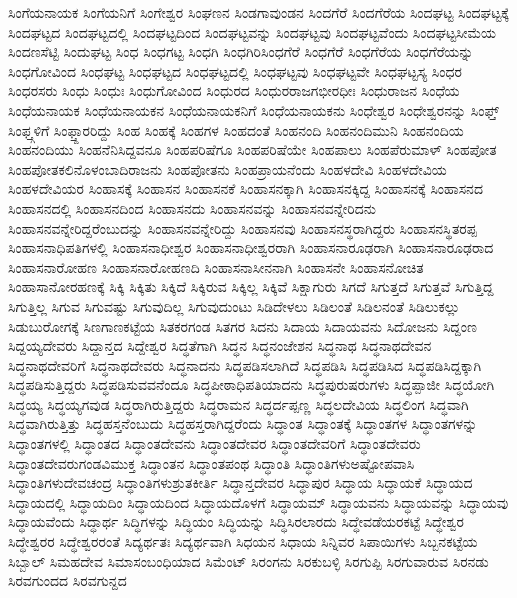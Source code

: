 {ಸಿಂಗೆಯನಾಯಕ
ಸಿಂಗೆಯನಿಗೆ
ಸಿಂಗೇಶ್ವರ
ಸಿಂಘಣನ
ಸಿಂಡಗಾವುಂಡನ
ಸಿಂದಗೆರೆ
ಸಿಂದಗೆರೆಯ
ಸಿಂದಘಟ್ಟ
ಸಿಂದಘಟ್ಟಕ್ಕೆ
ಸಿಂದಘಟ್ಟದ
ಸಿಂದಘಟ್ಟದಲ್ಲಿ
ಸಿಂದಘಟ್ಟದಿಂದ
ಸಿಂದಘಟ್ಟವನ್ನು
ಸಿಂದಘಟ್ಟವು
ಸಿಂದಘಟ್ಟವೆಂದು
ಸಿಂದಘಟ್ಟಸೀಮೆಯ
ಸಿಂದಣಸೆಟ್ಟಿ
ಸಿಂದುಘಟ್ಟ
ಸಿಂಧ
ಸಿಂಧಗಟ್ಟ
ಸಿಂಧಗಿ
ಸಿಂಧಗಿರಿಸಿಂಧಗೆರೆ
ಸಿಂಧಗೆರೆ
ಸಿಂಧಗೆರೆಯ
ಸಿಂಧಗೆರೆಯನ್ನು
ಸಿಂಧಗೋವಿಂದ
ಸಿಂಧಘಟ್ಟ
ಸಿಂಧಘಟ್ಟದ
ಸಿಂಧಘಟ್ಟದಲ್ಲಿ
ಸಿಂಧಘಟ್ಟವು
ಸಿಂಧಘಟ್ಟವೇ
ಸಿಂಧಘಟ್ಟಸ್ಯ
ಸಿಂಧರ
ಸಿಂಧರಸರು
ಸಿಂಧು
ಸಿಂಧುಃ
ಸಿಂಧುಗೋವಿಂದ
ಸಿಂಧುರದ
ಸಿಂಧುರರಾಜಗಭೀರಧೀಃ
ಸಿಂಧುರಾಜನ
ಸಿಂಧೆಯ
ಸಿಂಧೆಯನಾಯಕ
ಸಿಂಧೆಯನಾಯಕನ
ಸಿಂಧೆಯನಾಯಕನಿಗೆ
ಸಿಂಧೆಯನಾಯಕನು
ಸಿಂಧೇಶ್ವರ
ಸಿಂಧೇಶ್ವರನನ್ನು
ಸಿಂಫ್ತ್
ಸಿಂಫ್ತ್ಗಳಿಗೆ
ಸಿಂಫ್ತ್ದಾರರಿದ್ದು
ಸಿಂಹ
ಸಿಂಹಕ್ಕೆ
ಸಿಂಹಗಳ
ಸಿಂಹದಂತೆ
ಸಿಂಹನಂದಿ
ಸಿಂಹನಂದಿಮುನಿ
ಸಿಂಹನಂದಿಯ
ಸಿಂಹನಂದಿಯು
ಸಿಂಹನೆನಿಸಿದ್ದವನೂ
ಸಿಂಹಪರಿಷೆಗೂ
ಸಿಂಹಪರಿಷೆಯೇ
ಸಿಂಹಪಾಲು
ಸಿಂಹಪೆರುಮಾಳ್
ಸಿಂಹಪೋತ
ಸಿಂಹಪೋತಕಲಿನೊಳಂಬಾದಿರಾಜನು
ಸಿಂಹಪೋತನು
ಸಿಂಹಪ್ರಾಯನೆಂದು
ಸಿಂಹಳದೇವಿ
ಸಿಂಹಳದೇವಿಯ
ಸಿಂಹಳದೇವಿಯರ
ಸಿಂಹಾಸಕ್ಕೆ
ಸಿಂಹಾಸನ
ಸಿಂಹಾಸನಕೆ
ಸಿಂಹಾಸನಕ್ಕಾಗಿ
ಸಿಂಹಾಸನಕ್ಕಿದ್ದ
ಸಿಂಹಾಸನಕ್ಕೆ
ಸಿಂಹಾಸನದ
ಸಿಂಹಾಸನದಲ್ಲಿ
ಸಿಂಹಾಸನದಿಂದ
ಸಿಂಹಾಸನದು
ಸಿಂಹಾಸನವನ್ನು
ಸಿಂಹಾಸನವನ್ನೇರಿದನು
ಸಿಂಹಾಸನವನ್ನೇರಿದ್ದರೆಂಬುದನ್ನು
ಸಿಂಹಾಸನವನ್ನೇರಿದ್ದು
ಸಿಂಹಾಸನವು
ಸಿಂಹಾಸನಸ್ಥರಾಗಿದ್ದರು
ಸಿಂಹಾಸನಸ್ಥಿತರಪ್ಪ
ಸಿಂಹಾಸನಾಧಿಪತಿಗಳಲ್ಲಿ
ಸಿಂಹಾಸನಾಧೀಶ್ವರ
ಸಿಂಹಾಸನಾಧೀಶ್ವರರಾಗಿ
ಸಿಂಹಾಸನಾರೂಢರಾಗಿ
ಸಿಂಹಾಸನಾರೂಢರಾದ
ಸಿಂಹಾಸನಾರೋಹಣ
ಸಿಂಹಾಸನಾರೋಹಣದಿ
ಸಿಂಹಾಸನಾಸೀನನಾಗಿ
ಸಿಂಹಾಸನೇ
ಸಿಂಹಾಸನೋಚಿತ
ಸಿಂಹಾಸಾನೋರಹಣಕ್ಕೆ
ಸಿಕ್ಕಿ
ಸಿಕ್ಕಿತು
ಸಿಕ್ಕಿದೆ
ಸಿಕ್ಕಿರುವ
ಸಿಕ್ಕಿಲ್ಲ
ಸಿಕ್ಕಿವೆ
ಸಿಕ್ಷಾಗುರು
ಸಿಗದೆ
ಸಿಗುತ್ತದೆ
ಸಿಗುತ್ತವೆ
ಸಿಗುತ್ತಿದ್ದ
ಸಿಗುತ್ತಿಲ್ಲ
ಸಿಗುವ
ಸಿಗುವಷ್ಟು
ಸಿಗುವುದಿಲ್ಲ
ಸಿಗುವುದುಂಟು
ಸಿಡಿದೇಳಲು
ಸಿಡಿಲಂತೆ
ಸಿಡಿಲನಂತೆ
ಸಿಡಿಲುಕಲ್ಲು
ಸಿಡುಬುರೋಗಕ್ಕೆ
ಸಿಣಗಾಣಕಟ್ಟೆಯ
ಸಿತಕರಗಂಡ
ಸಿತಗರ
ಸಿದನು
ಸಿದಾಯ
ಸಿದಾಯವನು
ಸಿದೋಜನು
ಸಿದ್ದಂಣ
ಸಿದ್ದಯ್ಯದೇವರು
ಸಿದ್ದಾನ್ತದ
ಸಿದ್ದೇಶ್ವರ
ಸಿದ್ಧತೆಗಾಗಿ
ಸಿದ್ಧನ
ಸಿದ್ಧನಂಜೇಶನ
ಸಿದ್ಧನಾಥ
ಸಿದ್ಧನಾಥದೇವನ
ಸಿದ್ಧನಾಥದೇವರಿಗೆ
ಸಿದ್ಧನಾಥದೇವರು
ಸಿದ್ಧನಾದನು
ಸಿದ್ಧಪಡಿಸಲಾಗಿದೆ
ಸಿದ್ಧಪಡಿಸಿ
ಸಿದ್ಧಪಡಿಸಿದ
ಸಿದ್ಧಪಡಿಸಿದ್ದಕ್ಕಾಗಿ
ಸಿದ್ಧಪಡಿಸುತ್ತಿದ್ದರು
ಸಿದ್ಧಪಡಿಸುವವನೆಂದೂ
ಸಿದ್ಧಪೀಠಾಧಿಪತಿಯಾದನು
ಸಿದ್ಧಪುರುಷರುಗಳು
ಸಿದ್ಧಪ್ಪಾಜೀ
ಸಿದ್ಧಯೋಗಿ
ಸಿದ್ಧಯ್ಯ
ಸಿದ್ಧಯ್ಯಗವುಡ
ಸಿದ್ಧರಾಗಿರುತ್ತಿದ್ದರು
ಸಿದ್ಧರಾಮನ
ಸಿದ್ಧರ್ದಪ್ಪಣ್ಣ
ಸಿದ್ಧಲದೇವಿಯ
ಸಿದ್ಧಲಿಂಗ
ಸಿದ್ಧವಾಗಿ
ಸಿದ್ಧವಾಗಿರುತ್ತಿತ್ತು
ಸಿದ್ಧಹಸ್ತನೆಂಬುದು
ಸಿದ್ಧಹಸ್ತರಾಗಿದ್ದರೆಂದು
ಸಿದ್ಧಾಂತ
ಸಿದ್ಧಾಂತಕ್ಕೆ
ಸಿದ್ಧಾಂತಗಳ
ಸಿದ್ಧಾಂತಗಳನ್ನು
ಸಿದ್ಧಾಂತಗಳಲ್ಲಿ
ಸಿದ್ಧಾಂತದ
ಸಿದ್ಧಾಂತದೇವನು
ಸಿದ್ಧಾಂತದೇವರ
ಸಿದ್ಧಾಂತದೇವರಿಗೆ
ಸಿದ್ಧಾಂತದೇವರು
ಸಿದ್ಧಾಂತದೇವರುಗಂಡವಿಮುಕ್ತ
ಸಿದ್ಧಾಂತನ
ಸಿದ್ಧಾಂತಪಂಥ
ಸಿದ್ಧಾಂತಿ
ಸಿದ್ಧಾಂತಿಗಳುಅಷ್ಟೋಪವಾಸಿ
ಸಿದ್ಧಾಂತಿಗಳುದೇವಚಂದ್ರ
ಸಿದ್ಧಾಂತಿಗಳುಶ್ರುತಕೀರ್ತಿ
ಸಿದ್ಧಾನ್ತದೇವರ
ಸಿದ್ಧಾಪುರ
ಸಿದ್ಧಾಯ
ಸಿದ್ಧಾಯಕೆ
ಸಿದ್ಧಾಯದ
ಸಿದ್ಧಾಯದಲ್ಲಿ
ಸಿದ್ಧಾಯದಿಂ
ಸಿದ್ಧಾಯದಿಂದ
ಸಿದ್ಧಾಯದೊಳಗೆ
ಸಿದ್ಧಾಯಮ್
ಸಿದ್ಧಾಯವನು
ಸಿದ್ಧಾಯವನ್ನು
ಸಿದ್ಧಾಯವು
ಸಿದ್ಧಾಯವೆಂದು
ಸಿದ್ಧಾರ್ಥ
ಸಿದ್ಧಿಗಳನ್ನು
ಸಿದ್ಧಿಯಂ
ಸಿದ್ಧಿಯನ್ನು
ಸಿದ್ಧಿಸಿರಲಾರದು
ಸಿದ್ಧೇವಡೆಯರಕಟ್ಟೆ
ಸಿದ್ಧೇಶ್ವರ
ಸಿದ್ಧೇಶ್ವರರ
ಸಿದ್ಧೇಶ್ವರರಂತೆ
ಸಿದ್ಯರ್ಥತಃ
ಸಿದ್ಯರ್ಥವಾಗಿ
ಸಿಧಯನ
ಸಿಧಾಯ
ಸಿನ್ನಿವರ
ಸಿಪಾಯಿಗಳು
ಸಿಬ್ಬನಕಟ್ಟೆಯ
ಸಿಬ್ಬಾಲ್
ಸಿಮಹದೇವ
ಸಿಮಾಸಂಬಂಧಿಯಾದ
ಸಿಮೆಂಟ್
ಸಿರಂಗನು
ಸಿರಕುಬಳ್ಳಿ
ಸಿರಗುಪ್ಪಿ
ಸಿರಗುವಾರುವ
ಸಿರನಡು
ಸಿರವಗುಂದದ
ಸಿರವಗುನ್ದದ
}
